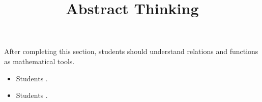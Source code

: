 \documentclass{ximera}
\title{Abstract Thinking}
\begin{document}
\begin{abstract}
\end{abstract}

\maketitle

\begin{sectionOutcomes}

After completing this section, students should understand relations and functions as mathematical tools. 

\begin{itemize}
\item Students .
\item Students .
\end{itemize}

\end{sectionOutcomes}
\end{document}

